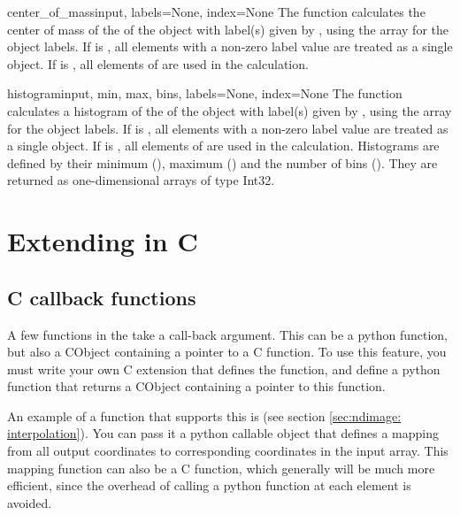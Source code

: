 \begin{funcdesc}{center_of_mass}{input, labels=None, index=None}
  The  function calculates the center of mass of 
  the of the object with label(s) given by , using the 
   array for the object labels. If  is 
  , all elements with a non-zero label value are treated as 
  a single object. If  is , all elements of 
   are used in the calculation.
\end{funcdesc}

\begin{funcdesc}{histogram}{input, min, max, bins, labels=None, index=None}
  The  function calculates a histogram of 
  the of the object with label(s) given by , using the 
   array for the object labels. If  is 
  , all elements with a non-zero label value are treated as 
  a single object. If  is , all elements of 
   are used in the calculation. Histograms are defined by their 
  minimum (), maximum () and the number of bins 
  (). They are returned as one-dimensional arrays of type Int32. 
\end{funcdesc}

\section{Extending  in C}
\label{sec:ndimage:ccallbacks}
\subsection{C callback functions}
A few functions in the  take a call-back 
argument. This can be a python function, but also a CObject containing a 
pointer to a C function. To use this feature, you must write your own C 
extension that defines the function, and define a python function that 
returns a CObject containing a pointer to this function.

An example of a function that supports this is 
 (see section \ref{sec:ndimage:
interpolation}). You can pass it a python callable object that defines a 
mapping from all output coordinates to corresponding coordinates in the 
input array. This mapping function can also be a C function, which 
generally will be much more efficient, since the overhead of calling a
python function at each element is avoided.

